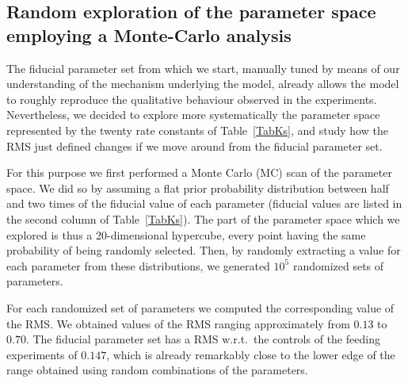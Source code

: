 \documentclass[oneside, 10pt, a4paper, twocolumn]{article}
\begin{document}
\subsection{Random exploration of the parameter space employing a Monte-Carlo analysis}

The fiducial parameter set from which we start, manually tuned by means of our understanding of the mechanism underlying the model, already allows the model to roughly reproduce the qualitative behaviour observed in the experiments. Nevertheless, we decided to explore more systematically the parameter space represented by the twenty rate constants of Table~\ref{TabKs}, and study how the RMS just defined changes if we move around from the fiducial parameter set.


For this purpose we first performed a Monte Carlo (MC) scan of the parameter space. 
We did so by assuming a flat prior probability distribution between half and two times of the fiducial value of each parameter (fiducial values are listed in the second column of Table~\ref{TabKs}). The part of the parameter space which we explored is thus a 20-dimensional hypercube, every point having the same probability of being randomly selected.
Then, by randomly extracting a value for each parameter from these distributions, we generated $10^5$ randomized sets of parameters.

For each randomized set of parameters we computed the corresponding value of the RMS. We obtained values of the RMS ranging approximately from $0.13$ to $0.70$. 
The fiducial parameter set has a RMS w.r.t.~the controls of the feeding experiments of $0.147$, which is already remarkably close to the lower edge of the range obtained using random combinations of the parameters. 

\end{document}
